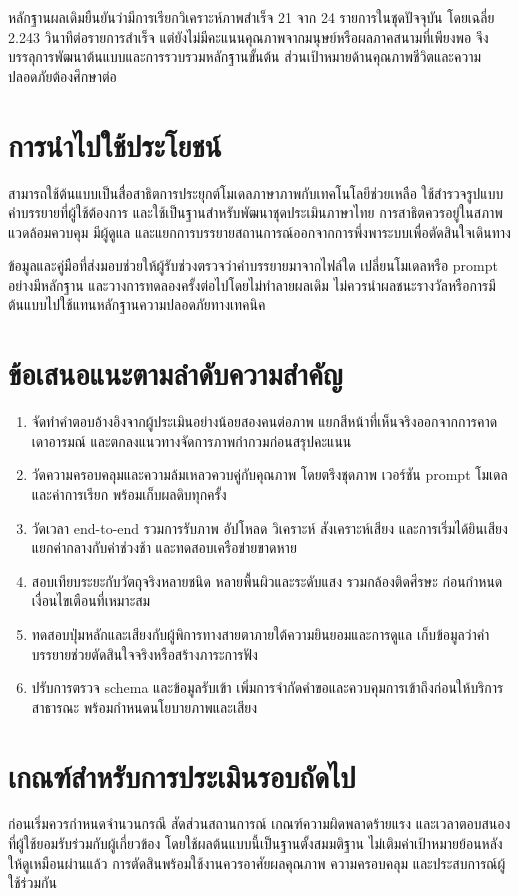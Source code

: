 หลักฐานผลเดิมยืนยันว่ามีการเรียกวิเคราะห์ภาพสำเร็จ 21 จาก 24 รายการในชุดปัจจุบัน โดยเฉลี่ย 2.243 วินาทีต่อรายการสำเร็จ แต่ยังไม่มีคะแนนคุณภาพจากมนุษย์หรือผลภาคสนามที่เพียงพอ จึงบรรลุการพัฒนาต้นแบบและการรวบรวมหลักฐานขั้นต้น ส่วนเป้าหมายด้านคุณภาพชีวิตและความปลอดภัยต้องศึกษาต่อ

\section{การนำไปใช้ประโยชน์}
สามารถใช้ต้นแบบเป็นสื่อสาธิตการประยุกต์โมเดลภาษาภาพกับเทคโนโลยีช่วยเหลือ ใช้สำรวจรูปแบบคำบรรยายที่ผู้ใช้ต้องการ และใช้เป็นฐานสำหรับพัฒนาชุดประเมินภาษาไทย การสาธิตควรอยู่ในสภาพแวดล้อมควบคุม มีผู้ดูแล และแยกการบรรยายสถานการณ์ออกจากการพึ่งพาระบบเพื่อตัดสินใจเดินทาง

ข้อมูลและคู่มือที่ส่งมอบช่วยให้ผู้รับช่วงตรวจว่าคำบรรยายมาจากไฟล์ใด เปลี่ยนโมเดลหรือ prompt อย่างมีหลักฐาน และวางการทดลองครั้งต่อไปโดยไม่ทำลายผลเดิม ไม่ควรนำผลชนะรางวัลหรือการมีต้นแบบไปใช้แทนหลักฐานความปลอดภัยทางเทคนิค

\section{ข้อเสนอแนะตามลำดับความสำคัญ}
\begin{enumerate}
\item จัดทำคำตอบอ้างอิงจากผู้ประเมินอย่างน้อยสองคนต่อภาพ แยกสีหน้าที่เห็นจริงออกจากการคาดเดาอารมณ์ และตกลงแนวทางจัดการภาพกำกวมก่อนสรุปคะแนน
\item วัดความครอบคลุมและความล้มเหลวควบคู่กับคุณภาพ โดยตรึงชุดภาพ เวอร์ชัน prompt โมเดล และค่าการเรียก พร้อมเก็บผลดิบทุกครั้ง
\item วัดเวลา end-to-end รวมการรับภาพ อัปโหลด วิเคราะห์ สังเคราะห์เสียง และการเริ่มได้ยินเสียง แยกค่ากลางกับค่าช่วงช้า และทดสอบเครือข่ายขาดหาย
\item สอบเทียบระยะกับวัตถุจริงหลายชนิด หลายพื้นผิวและระดับแสง รวมกล้องติดศีรษะ ก่อนกำหนดเงื่อนไขเตือนที่เหมาะสม
\item ทดสอบปุ่มหลักและเสียงกับผู้พิการทางสายตาภายใต้ความยินยอมและการดูแล เก็บข้อมูลว่าคำบรรยายช่วยตัดสินใจจริงหรือสร้างภาระการฟัง
\item ปรับการตรวจ schema และข้อมูลรับเข้า เพิ่มการจำกัดคำขอและควบคุมการเข้าถึงก่อนให้บริการสาธารณะ พร้อมกำหนดนโยบายภาพและเสียง
\end{enumerate}

\section{เกณฑ์สำหรับการประเมินรอบถัดไป}
ก่อนเริ่มควรกำหนดจำนวนกรณี สัดส่วนสถานการณ์ เกณฑ์ความผิดพลาดร้ายแรง และเวลาตอบสนองที่ผู้ใช้ยอมรับร่วมกับผู้เกี่ยวข้อง โดยใช้ผลต้นแบบนี้เป็นฐานตั้งสมมติฐาน ไม่เติมค่าเป้าหมายย้อนหลังให้ดูเหมือนผ่านแล้ว การตัดสินพร้อมใช้งานควรอาศัยผลคุณภาพ ความครอบคลุม และประสบการณ์ผู้ใช้ร่วมกัน

